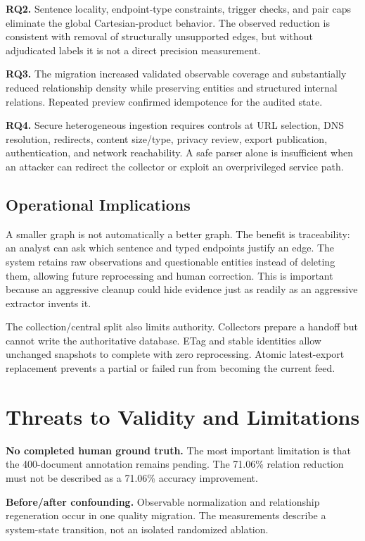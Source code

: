 \documentclass[conference]{IEEEtran}
\begin{document}
\textbf{RQ2.} Sentence locality, endpoint-type constraints, trigger checks, and pair caps eliminate the global Cartesian-product behavior. The observed reduction is consistent with removal of structurally unsupported edges, but without adjudicated labels it is not a direct precision measurement.

\textbf{RQ3.} The migration increased validated observable coverage and substantially reduced relationship density while preserving entities and structured internal relations. Repeated preview confirmed idempotence for the audited state.

\textbf{RQ4.} Secure heterogeneous ingestion requires controls at URL selection, DNS resolution, redirects, content size/type, privacy review, export publication, authentication, and network reachability. A safe parser alone is insufficient when an attacker can redirect the collector or exploit an overprivileged service path.

\subsection{Operational Implications}
A smaller graph is not automatically a better graph. The benefit is traceability: an analyst can ask which sentence and typed endpoints justify an edge. The system retains raw observations and questionable entities instead of deleting them, allowing future reprocessing and human correction. This is important because an aggressive cleanup could hide evidence just as readily as an aggressive extractor invents it.

The collection/central split also limits authority. Collectors prepare a handoff but cannot write the authoritative database. ETag and stable identities allow unchanged snapshots to complete with zero reprocessing. Atomic latest-export replacement prevents a partial or failed run from becoming the current feed.

\section{Threats to Validity and Limitations}
\textbf{No completed human ground truth.} The most important limitation is that the 400-document annotation remains pending. The 71.06\% relation reduction must not be described as a 71.06\% accuracy improvement.

\textbf{Before/after confounding.} Observable normalization and relationship regeneration occur in one quality migration. The measurements describe a system-state transition, not an isolated randomized ablation.
\end{document}

